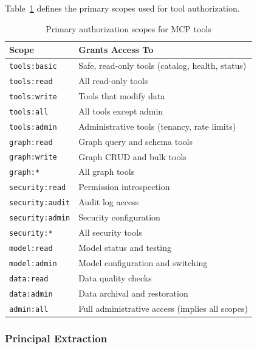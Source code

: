 Table~\ref{tab:scope-definitions} defines the primary scopes used for tool authorization.

\begin{table}[htbp]
    \centering
    \caption{Primary authorization scopes for MCP tools}
    \label{tab:scope-definitions}
    \begin{tabularx}{\textwidth}{lX}
        \toprule
        \textbf{Scope} & \textbf{Grants Access To} \\
        \midrule
        \texttt{tools:basic} & Safe, read-only tools (catalog, health, status) \\
        \texttt{tools:read} & All read-only tools \\
        \texttt{tools:write} & Tools that modify data \\
        \texttt{tools:all} & All tools except admin \\
        \texttt{tools:admin} & Administrative tools (tenancy, rate limits) \\
        \midrule
        \texttt{graph:read} & Graph query and schema tools \\
        \texttt{graph:write} & Graph CRUD and bulk tools \\
        \texttt{graph:*} & All graph tools \\
        \midrule
        \texttt{security:read} & Permission introspection \\
        \texttt{security:audit} & Audit log access \\
        \texttt{security:admin} & Security configuration \\
        \texttt{security:*} & All security tools \\
        \midrule
        \texttt{model:read} & Model status and testing \\
        \texttt{model:admin} & Model configuration and switching \\
        \midrule
        \texttt{data:read} & Data quality checks \\
        \texttt{data:admin} & Data archival and restoration \\
        \midrule
        \texttt{admin:all} & Full administrative access (implies all scopes) \\
        \bottomrule
    \end{tabularx}
\end{table}

\subsubsection{Principal Extraction}

